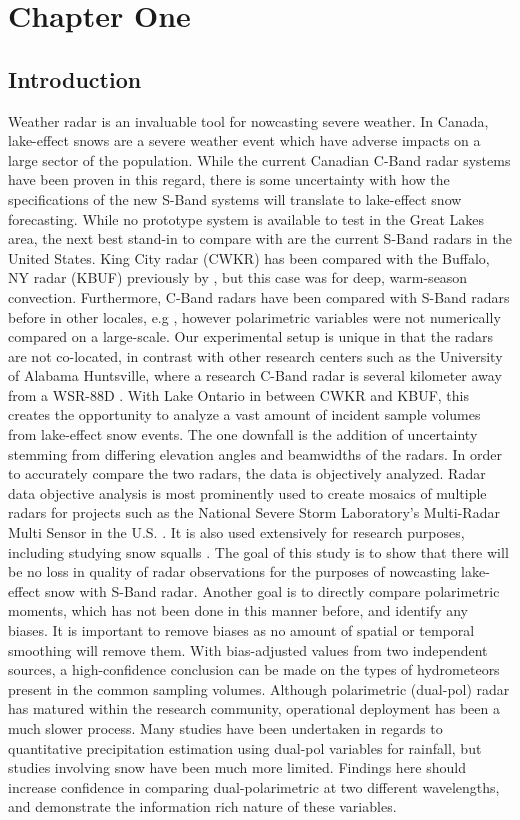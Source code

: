 \chapter{Chapter One}
\section{Introduction}
Weather radar is an invaluable tool for nowcasting severe weather. In Canada, lake-effect snows are a
severe weather event which have adverse impacts on a large
sector of the population. While the current Canadian C-Band radar systems have been proven in this
regard, there is some uncertainty with how the specifications of the new S-Band systems will translate to lake-effect snow forecasting. While no prototype
system is available to test in the Great Lakes area, the next best stand-in to compare with are the current
S-Band
radars in the United States. King City radar (CWKR) has been compared with the Buffalo, NY radar (KBUF)
previously by \cite{Boodoo2015}, but this case was for deep, warm-season convection. Furthermore, C-Band radars have been compared with S-Band radars before in other locales, e.g \citep{Abon2014,
WMO2008}, however polarimetric variables were not numerically compared on a large-scale. Our experimental setup is unique in that the radars are not co-located, in contrast with other research centers such as the University of Alabama
Huntsville, where a research C-Band radar is several kilometer away from a WSR-88D
\citep{Petersen2007}. With Lake Ontario in between CWKR and KBUF, this creates the opportunity to analyze a vast amount of incident sample volumes from lake-effect snow events. The one downfall is the addition of uncertainty stemming from differing elevation angles and beamwidths of the radars. In order to accurately compare the two
radars, the data is objectively analyzed. Radar data objective analysis is most prominently used to create
mosaics of multiple radars for projects such as the National Severe Storm Laboratory's Multi-Radar Multi
Sensor in the U.S. \citep{Zhang2016}. It is also used extensively for research purposes, including studying
snow squalls \citep{Mulholland2017}.  The goal of this study is to show that there will be no loss in quality
of radar observations for the purposes of
nowcasting lake-effect snow with S-Band radar. Another goal is to directly compare polarimetric moments,
which has not been done in this manner before, and
identify any biases. It is important to remove biases as no amount of spatial or temporal smoothing will
remove them. With bias-adjusted values from two independent sources, a high-confidence conclusion can
be made on the types of hydrometeors present in the common sampling volumes. Although polarimetric
(dual-pol) radar has matured within the research community, operational deployment has been a much
slower process. Many studies have been undertaken in regards to quantitative precipitation estimation
using dual-pol variables for rainfall, but studies involving snow have been much more limited. Findings here
should increase confidence in comparing dual-polarimetric at two different wavelengths, and demonstrate
the information rich nature of these variables. 
